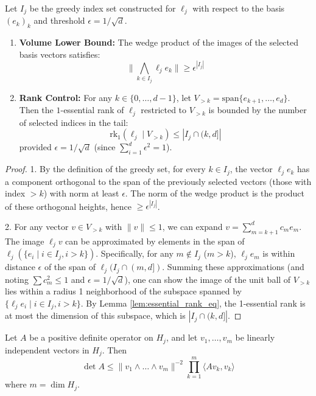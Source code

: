 \begin{lemma}
\label{lem:greedy_set_properties}
Let $I_j$ be the greedy index set constructed for $\ell_j$ with respect to the basis $(e_k)_k$ and threshold $\epsilon = 1/\sqrt{d}$.
\begin{enumerate}
    \item \textbf{Volume Lower Bound:} The wedge product of the images of the selected basis vectors satisfies:
    $$\| \bigwedge_{k \in I_j} \ell_j e_k \| \ge \epsilon^{|I_j|}$$
    \item \textbf{Rank Control:} For any $k \in \{0, \dots, d-1\}$, let $V_{>k} = \mathrm{span}\{e_{k+1}, \dots, e_d\}$. Then the $1$-essential rank of $\ell_j$ restricted to $V_{>k}$ is bounded by the number of selected indices in the tail:
    $$\mathrm{rk}_{1}(\ell_j \mid V_{>k}) \le |I_j \cap (k, d]|$$
    provided $\epsilon = 1/\sqrt{d}$ (since $\sum_{i=1}^d \epsilon^2 = 1$).
\end{enumerate}
\end{lemma}

\begin{proof}
1. By the definition of the greedy set, for every $k \in I_j$, the vector $\ell_j e_k$ has a component orthogonal to the span of the previously selected vectors (those with index $> k$) with norm at least $\epsilon$. The norm of the wedge product is the product of these orthogonal heights, hence $\ge \epsilon^{|I_j|}$.

2. For any vector $v \in V_{>k}$ with $\|v\| \le 1$, we can expand $v = \sum_{m=k+1}^d c_m e_m$. The image $\ell_j v$ can be approximated by elements in the span of $\ell_j(\{e_i \mid i \in I_j, i > k\})$. Specifically, for any $m \notin I_j$ ($m > k$), $\ell_j e_m$ is within distance $\epsilon$ of the span of $\ell_j(I_j \cap (m, d])$. Summing these approximations (and noting $\sum c_m^2 \le 1$ and $\epsilon = 1/\sqrt{d}$), one can show the image of the unit ball of $V_{>k}$ lies within a radius 1 neighborhood of the subspace spanned by $\{\ell_j e_i \mid i \in I_j, i > k\}$. By Lemma \ref{lem:essential_rank_eq}, the 1-essential rank is at most the dimension of this subspace, which is $|I_j \cap (k, d]|$.
\end{proof}

\begin{lemma}
\label{lem:hadamard_bound}
Let $A$ be a positive definite operator on $H_j$, and let $v_1, \dots, v_m$ be linearly independent vectors in $H_j$. Then
$$\det A \le \| v_1 \wedge \dots \wedge v_m \|^{-2} \prod_{k=1}^m \langle A v_k, v_k \rangle$$
where $m = \dim H_j$.
\end{lemma}

